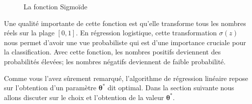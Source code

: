\documentclass[letterpaper,11pt,english]{sphinxmanual}
\begin{document}
\begin{figure}[H]
\centering
\capstart

\noindent{}
\caption{La fonction Sigmoïde}\label{\detokenize{chapter3:id15}}\end{figure}

\sphinxAtStartPar
Une qualité importante de cette fonction est qu’elle transforme tous les
nombres réels sur la plage \([0, 1]\). En régression logistique,
cette transformation \(\sigma (z)\) nous permet d’avoir une vue
probabiliste qui est d’une importance cruciale pour la classification.
Avec cette fonction, les nombres positifs deviennent des probabilités
élevées; les nombres négatifs deviennent de faible probabilité.

\sphinxAtStartPar
Comme vous l’avez sûrement remarqué, l’algorithme de régression linéaire
repose sur l’obtention d’un paramètre \(\boldsymbol{\theta}^{*}\)
dit optimal. Dans la section suivante nous allons discuter sur le choix
et l’obtention de la valeur \(\boldsymbol{\theta}^{*}\).
\end{document}
